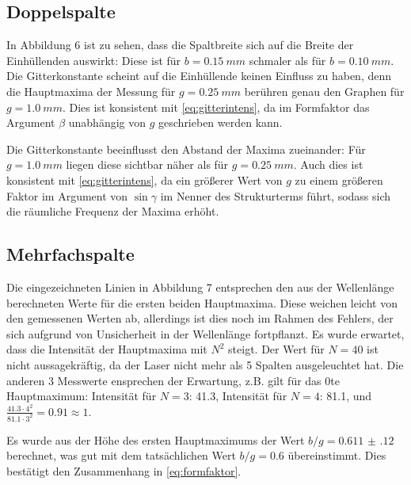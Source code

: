 \subsection{Doppelspalte}
In Abbildung 6 ist zu sehen, dass die Spaltbreite sich auf die Breite der Einhüllenden auswirkt: Diese ist für $b=\SI{0.15}{mm}$ schmaler als für $b=\SI{0.10}{mm}$. Die Gitterkonstante scheint auf die Einhüllende keinen Einfluss zu haben, denn die Hauptmaxima der Messung für $g=\SI{0.25}{mm}$ berühren genau den Graphen für $g=\SI{1.0}{mm}$. Dies ist konsistent mit \cref{eq:gitterintens}, da im Formfaktor das Argument $\beta$ unabhängig von $g$ geschrieben werden kann.

Die Gitterkonstante beeinflusst den Abstand der Maxima zueinander: Für $g=\SI{1.0}{mm}$ liegen diese sichtbar näher als für $g=\SI{0.25}{mm}$. Auch dies ist konsistent mit \cref{eq:gitterintens}, da ein größerer Wert von $g$ zu einem größeren Faktor im Argument von $\sin\gamma$ im Nenner des Strukturterms führt, sodass sich die räumliche Frequenz der Maxima erhöht.
\subsection{Mehrfachspalte}
Die eingezeichneten Linien in Abbildung 7 entsprechen den aus der Wellenlänge berechneten Werte für die ersten beiden Hauptmaxima. Diese weichen leicht von den gemessenen Werten ab, allerdings ist dies noch im Rahmen des Fehlers, der sich aufgrund von Unsicherheit in der Wellenlänge fortpflanzt. Es wurde erwartet, dass die Intensität der Hauptmaxima mit $N^2$ steigt. Der Wert für $N=40$ ist nicht aussagekräftig, da der Laser nicht mehr als 5 Spalten ausgeleuchtet hat. Die anderen 3 Messwerte ensprechen der Erwartung, z.B. gilt für das 0te Hauptmaximum: Intensität für $N=3$: \num{41.3}, Intensität für $N=4$: \num{81.1}, und $\frac{41.3 \cdot 4^2}{81.1\cdot 3^2}=\num{0.91}\approx 1$.

Es wurde aus der Höhe des ersten Hauptmaximums der Wert $b/g=\num{0.611(120)}$ berechnet, was gut mit dem tatsächlichen Wert $b/g=\num{0.6}$ übereinstimmt. Dies bestätigt den Zusammenhang in \cref{eq:formfaktor}.

